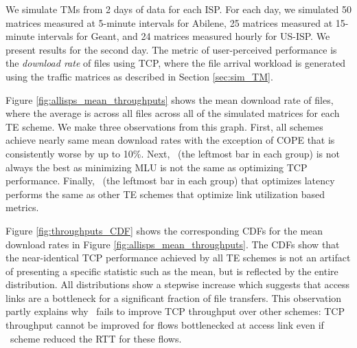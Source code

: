 We simulate TMs from 2 days of data for each ISP. For each day, we simulated 50 matrices measured at 5-minute intervals for Abilene, 25 matrices measured at 15-minute intervals for Geant, and 24 matrices measured hourly for US-ISP. We present results for the second day. The metric of user-perceived performance is the \emph{download rate} of files using TCP, where the file arrival workload is generated using the traffic matrices as described in Section \ref{sec:sim_TM}.

%


Figure \ref{fig:allisps_mean_throughputs} shows the mean download rate of files, where the average is across all files across all of the simulated matrices for each TE scheme.
We make three observations from this graph. 
First, all schemes achieve nearly same mean download rates with the exception of COPE that is consistently worse by up to  10\%.
Next, \opt\ (the leftmost bar in each group) is not always the best as minimizing MLU is not the same as optimizing TCP performance.
Finally,  \mindelay\ (the leftmost bar in each group) that optimizes latency performs the same as other TE schemes that optimize link utilization based metrics.


Figure \ref{fig:throughputs_CDF} shows the corresponding CDFs for the mean download rates in Figure \ref{fig:allisps_mean_throughputs}. The CDFs show that the near-identical TCP performance achieved by all TE schemes is not an artifact of presenting a specific statistic such as the mean, but is reflected by the entire distribution.  All distributions show a stepwise increase which suggests that access links are a bottleneck for a significant fraction of file transfers. This observation partly explains why \mindelay\ fails to  improve TCP throughput over other schemes: TCP throughput cannot be improved for flows bottlenecked at access link even if \mindelay\ scheme reduced the RTT for these flows.

